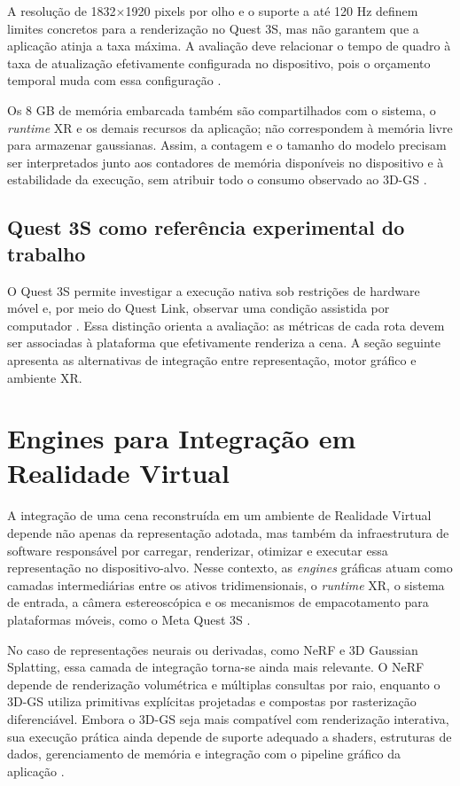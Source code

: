 A resolução de 1832$\times$1920 pixels por olho e o suporte a até 120 Hz definem limites concretos para a renderização no Quest 3S, mas não garantem que a aplicação atinja a taxa máxima. A avaliação deve relacionar o tempo de quadro à taxa de atualização efetivamente configurada no dispositivo, pois o orçamento temporal muda com essa configuração \cite{metaquest3s2024,xu2023}.

Os 8 GB de memória embarcada também são compartilhados com o sistema, o \textit{runtime} XR e os demais recursos da aplicação; não correspondem à memória livre para armazenar gaussianas. Assim, a contagem e o tamanho do modelo precisam ser interpretados junto aos contadores de memória disponíveis no dispositivo e à estabilidade da execução, sem atribuir todo o consumo observado ao 3D-GS \cite{metaquest3s2024,qualcommxr2gen2,fei2025survey3dgs}.

\subsection{Quest 3S como referência experimental do trabalho}

O Quest 3S permite investigar a execução nativa sob restrições de hardware móvel e, por meio do Quest Link, observar uma condição assistida por computador \cite{metaquest3s2024}. Essa distinção orienta a avaliação: as métricas de cada rota devem ser associadas à plataforma que efetivamente renderiza a cena. A seção seguinte apresenta as alternativas de integração entre representação, motor gráfico e ambiente XR.

\section{Engines para Integração em Realidade Virtual}

A integração de uma cena reconstruída em um ambiente de Realidade Virtual depende não apenas da representação adotada, mas também da infraestrutura de software responsável por carregar, renderizar, otimizar e executar essa representação no dispositivo-alvo. Nesse contexto, as \textit{engines} gráficas atuam como camadas intermediárias entre os ativos tridimensionais, o \textit{runtime} XR, o sistema de entrada, a câmera estereoscópica e os mecanismos de empacotamento para plataformas móveis, como o Meta Quest 3S \cite{metaquest3s2024,qualcommxr2gen2,xu2023,tu2025}.

No caso de representações neurais ou derivadas, como NeRF e 3D Gaussian Splatting, essa camada de integração torna-se ainda mais relevante. O NeRF depende de renderização volumétrica e múltiplas consultas por raio, enquanto o 3D-GS utiliza primitivas explícitas projetadas e compostas por rasterização diferenciável. Embora o 3D-GS seja mais compatível com renderização interativa, sua execução prática ainda depende de suporte adequado a shaders, estruturas de dados, gerenciamento de memória e integração com o pipeline gráfico da aplicação \cite{mildenhall2020,muller2022,kerbl2023,fei2025survey3dgs,chen2024survey3dgs}.

